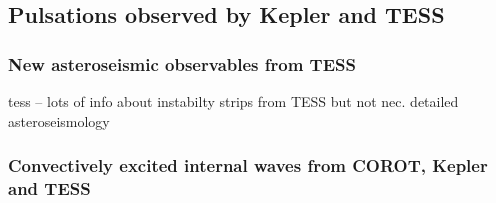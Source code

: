 {\color{blue}
\subsection{Pulsations observed by Kepler and TESS}



\subsubsection{New asteroseismic observables from TESS}

tess -- lots of info about instabilty strips from TESS but not nec. detailed asteroseismology

\subsubsection{Convectively excited internal waves from COROT, Kepler and TESS}


}
